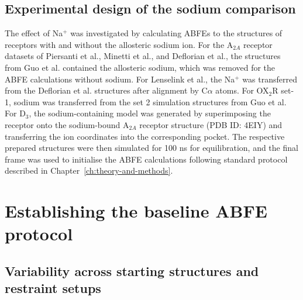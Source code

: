 \subsection{Experimental design of the sodium comparison}

The effect of Na$^{+}$ was investigated by calculating ABFEs to the structures of receptors with and without the allosteric sodium ion. For the A$_{2A}$ receptor datasets of Piersanti et al., Minetti et al., and Deflorian et al., the structures from Guo et al. contained the allosteric sodium, which was removed for the ABFE calculations without sodium. For Lenselink et al., the Na$^{+}$ was transferred from the Deflorian et al. structures after alignment by C$\alpha$ atoms. For OX$_2$R set-1, sodium was transferred from the set 2 simulation structures from Guo et al. For D$_3$, the sodium-containing model was generated by superimposing the receptor onto the sodium-bound A$_{2A}$ receptor structure (PDB ID: 4EIY) and transferring the ion coordinates into the corresponding pocket. The respective prepared structures were then simulated for 100 ns for equilibration, and the final frame was used to initialise the ABFE calculations following standard protocol described in Chapter~\ref{ch:theory-and-methods}.

\section{Establishing the baseline ABFE protocol}

\subsection{Variability across starting structures and restraint setups}

